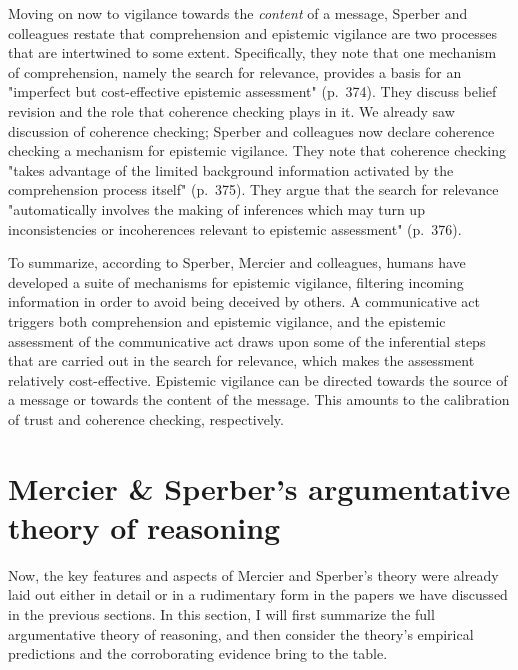 
Moving on now to vigilance towards the \emph{content} of a message, Sperber and colleagues restate that comprehension and epistemic vigilance are two processes that are intertwined to some extent. Specifically, they note that one mechanism of comprehension, namely the search for relevance, provides a basis for an "imperfect but cost-effective epistemic assessment" (p.~374).
They discuss belief revision and the role that coherence checking plays in it. We already saw  discussion of coherence checking; Sperber and colleagues now declare coherence checking a mechanism for epistemic vigilance. They note that coherence checking "takes advantage of the limited background information activated by the comprehension process itself" (p.~375). They argue that the search for relevance "automatically involves the making of inferences which may turn up inconsistencies or incoherences relevant to epistemic assessment" (p.~376).


To summarize, according to Sperber, Mercier and colleagues, humans have developed a suite of mechanisms for epistemic vigilance, filtering incoming information in order to avoid being deceived by others. A communicative act triggers both comprehension and epistemic vigilance, and the epistemic assessment of the communicative act draws upon some of the inferential steps that are carried out in the search for relevance, which makes the assessment relatively cost-effective. Epistemic vigilance can be directed towards the source of a message or towards the content of the message. This amounts to the calibration of trust and coherence checking, respectively.

\section{Mercier \& Sperber's argumentative theory of reasoning}
\label{sec:MS11}

Now, the key features and aspects of Mercier and Sperber's theory were already laid out either in detail or in a rudimentary form in the papers we have discussed in the previous sections.
In this section, I will first summarize the full argumentative theory of reasoning, and then consider the theory's empirical predictions and the corroborating evidence \citet{MS11} bring to the table.

